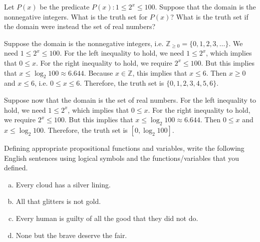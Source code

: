 \documentclass[11pt,letterpaper]{article}
\begin{document}
\newpage





 Let $P(x)$ be the predicate $P(x) \colon 1 \leq 2^x \leq 100$. Suppose that the domain is the nonnegative integers. What is the truth set for $P(x)$? What is the truth set if the domain were instead the set of real numbers? 

\sol Suppose the domain is the nonnegative integers, i.e. $\mathbb{Z}_{\geq 0}= \{ 0, 1, 2, 3, \ldots \}$. We need $1 \leq 2^x \leq 100$. For the left inequality to hold, we need $1 \leq 2^x$, which implies that $0 \leq x$. For the right inequality to hold, we require $2^x \leq 100$. But this implies that $x \leq \log_2 100 \approx 6.644$. Because $x \in \mathbb{Z}$, this implies that $x \leq 6$. Then $x \geq 0$ and $x \leq 6$, i.e. $0 \leq x \leq 6$. Therefore, the truth set is $\{ 0, 1, 2, 3, 4, 5, 6 \}$. 

Suppose now that the domain is the set of real numbers. For the left inequality to hold, we need $1 \leq 2^x$, which implies that $0 \leq x$. For the right inequality to hold, we require $2^x \leq 100$. But this implies that $x \leq \log_2 100 \approx 6.644$. Then $0 \leq x$ and $x \leq \log_2 100$. Therefore, the truth set is $[0, \log_2 100]$. 





\newpage





 Defining appropriate propositional functions and variables, write the following English sentences using logical symbols and the functions/variables that you defined. 
        \begin{enumerate}[(a)]
        \item Every cloud has a silver lining.
        \item All that glitters is not gold. 
        \item Every human is guilty of all the good that they did not do.
        \item None but the brave deserve the fair. 
        \end{enumerate}
\end{document}
